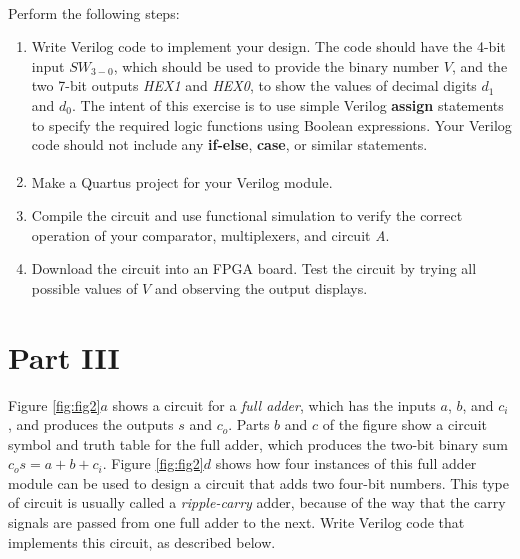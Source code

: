\documentclass[epsfig,10pt,fullpage]{article}
\begin{document}
~\\
Perform the following steps:
\begin{enumerate}
\item Write Verilog code to implement your design. The code
should have the 4-bit input $SW_{3-0}$, which should be
used to provide the binary number $V$, and the two 7-bit outputs {\it HEX1} and {\it HEX0},
to show the values of decimal digits $d_1$ and $d_0$. 
The intent of this exercise is to use simple Verilog {\bf assign}
statements to specify the required logic functions using Boolean
expressions. Your Verilog code should not include any {\bf if-else}, {\bf case}, or
similar statements. 
\item Make a Quartus\textsuperscript{\textregistered} project for your Verilog module.
\item Compile the circuit and use functional simulation to verify the correct operation of
your comparator, multiplexers, and circuit {\it A}.
\item Download the circuit into an FPGA board.  Test the circuit by trying all possible 
values of $V$ and observing the output displays.
\end{enumerate}

\section*{Part III}
Figure \ref{fig:fig2}$a$ shows a circuit for a {\it full adder}, 
which has the inputs $a$, $b$, and $c_i$,
and produces the outputs $s$ and $c_o$. Parts $b$ and $c$ of the figure show a circuit
symbol and truth table for the full adder, which produces the two-bit binary sum
$c_o s = a + b + c_i$. Figure \ref{fig:fig2}$d$ shows how four instances of this full adder module
can be used to design a circuit that adds two four-bit numbers. This type of circuit is
usually called a {\it ripple-carry} adder, because of the way that the carry signals are 
passed from one full adder to the next. Write Verilog code that implements this circuit,
as described below.
\end{document}
